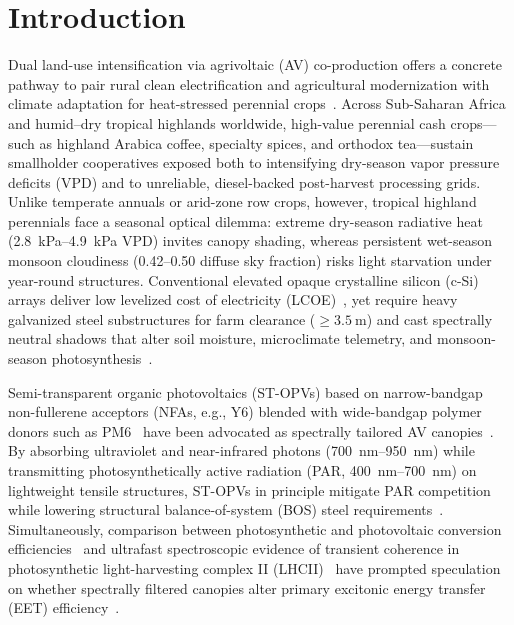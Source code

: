 \documentclass[preprint,12pt,a4paper]{elsarticle}
\begin{document}
\section{Introduction}
\label{sec:intro}

Dual land-use intensification via agrivoltaic (AV) co-production offers a concrete pathway to pair rural clean electrification and agricultural modernization with climate adaptation for heat-stressed perennial crops~\cite{Dupraz2011,BarronGafford2019,Asaa2024}. Across Sub-Saharan Africa and humid--dry tropical highlands worldwide, high-value perennial cash crops---such as highland Arabica coffee, specialty spices, and orthodox tea---sustain smallholder cooperatives exposed both to intensifying dry-season vapor pressure deficits (VPD) and to unreliable, diesel-backed post-harvest processing grids. Unlike temperate annuals or arid-zone row crops, however, tropical highland perennials face a seasonal optical dilemma: extreme dry-season radiative heat (\qtyrange{2.8}{4.9}{\kilo\pascal} VPD) invites canopy shading, whereas persistent wet-season monsoon cloudiness (\numrange{0.42}{0.50} diffuse sky fraction) risks light starvation under year-round structures. Conventional elevated opaque crystalline silicon (c-Si) arrays deliver low levelized cost of electricity (LCOE)~\cite{Amaducci2018,Zidane2025}, yet require heavy galvanized steel substructures for farm clearance ($\ge\qty{3.5}{\meter}$) and cast spectrally neutral shadows that alter soil moisture, microclimate telemetry, and monsoon-season photosynthesis~\cite{Marrou2013,Elamri2018,MaLu2022,Zainali2025}.

Semi-transparent organic photovoltaics (ST-OPVs) based on narrow-bandgap non-fullerene acceptors (NFAs, e.g., Y6) blended with wide-bandgap polymer donors such as PM6~\cite{Lunt2011,Yuan2019,Shen2025NatCommun} have been advocated as spectrally tailored AV canopies~\cite{Ravishankar2020,Thompson2020}. By absorbing ultraviolet and near-infrared photons (\qtyrange{700}{950}{\nano\meter}) while transmitting photosynthetically active radiation (PAR, \qtyrange{400}{700}{\nano\meter}) on lightweight tensile structures, ST-OPVs in principle mitigate PAR competition while lowering structural balance-of-system (BOS) steel requirements~\cite{Machui2014,Ravilla2024}. Simultaneously, comparison between photosynthetic and photovoltaic conversion efficiencies~\cite{Blankenship2011} and ultrafast spectroscopic evidence of transient coherence in photosynthetic light-harvesting complex II (LHCII)~\cite{Collini2010,Novoderezhkin2011,TeguiaKouam2026} have prompted speculation on whether spectrally filtered canopies alter primary excitonic energy transfer (EET) efficiency~\cite{Kassal2013,Kim2025SciAdv}.
\end{document}
